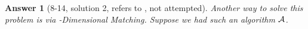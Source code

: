 \documentclass[11pt]{article}
\theoremstyle{numberplain}
\theoremstyle{nonumberplain}
\newtheorem{ans}{Answer}
\newcommand{\0}{{\mathbf{0}}}
\begin{document}
\begin{ans}[8-14, solution 2, refers to \cite{solcornell}, not attempted] 
Another way to solve this problem is via {-Dimensional Matching}. Suppose we had such an algorithm $\cal A$.

%
%
\end{ans}
\end{document}

